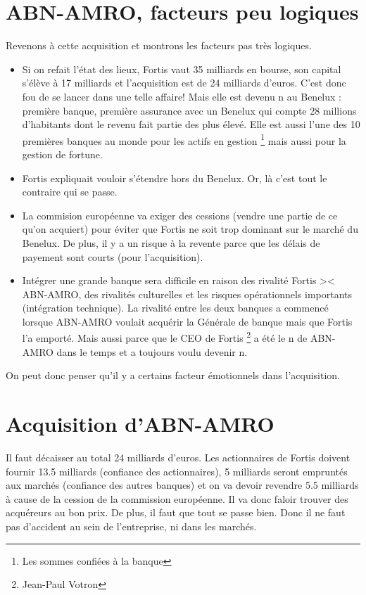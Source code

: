 \section{ABN-AMRO, facteurs peu logiques}
Revenons à cette acquisition et montrons les facteurs pas très logiques. 
\begin{itemize}
\item Si on refait l'état des lieux, Fortis vaut 35 milliards en bourse, son capital s'élève à 17 milliards et l'acquisition est de 24 milliards d'euros. C'est donc fou de se lancer dans une telle affaire! Mais elle est devenu n au Benelux : première banque, première assurance avec un Benelux qui compte 28 millions d'habitants dont le revenu fait partie des plus élevé. Elle est aussi l'une des 10 premières banques au monde pour les actifs en gestion \footnote{Les sommes confiées à la banque} mais aussi pour la gestion de fortune. 

\item Fortis expliquait vouloir s'étendre hors du Benelux. Or, là c'est tout le contraire qui se passe.

\item La commision européenne va exiger des cessions (vendre une partie de ce qu'on acquiert) pour éviter que Fortis ne soit trop dominant sur le marché du Benelux. De plus, il y a un risque à la revente parce que les délais de payement sont courts (pour l'acquisition).

\item Intégrer une grande banque sera difficile en raison des rivalité Fortis >< ABN-AMRO, des rivalités culturelles et les risques opérationnels importants (intégration technique). La rivalité entre les deux banques a commencé lorsque ABN-AMRO voulait acquérir la Générale de banque mais que Fortis l'a emporté. Mais aussi parce que le CEO de Fortis \footnote{Jean-Paul Votron} a été le n de ABN-AMRO dans le temps et a toujours voulu devenir n.
\end{itemize}
On peut donc penser qu'il y a certains facteur émotionnels dans l'acquisition. 

\section{Acquisition d'ABN-AMRO}
Il faut décaisser au total 24 milliards d'euros. Les actionnaires de Fortis doivent fournir 13.5 milliards (confiance des actionnaires), 5 milliards seront empruntés aux marchés (confiance des autres banques) et on va devoir revendre 5.5 milliards à cause de la cession de la commission européenne. Il va donc faloir trouver des acquéreurs au bon prix. De plus, il faut que tout se passe bien. Donc il ne faut pas d'accident au sein de l'entreprise, ni dans les marchés. \\

